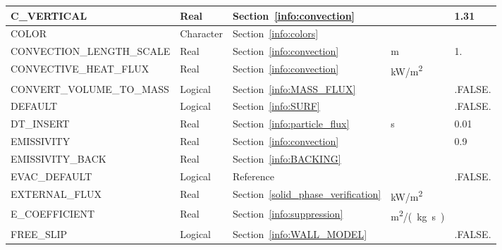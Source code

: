 \documentclass[11pt]{book}
\begin{document}
\begin{longtable}{@{\extracolsep{\fill}}|l|l|l|l|l|}
{\ct C\_VERTICAL}                       & Real            & Section~\ref{info:convection}             &                     & 1.31                    \\ \hline
{\ct COLOR    }                         & Character       & Section~\ref{info:colors}                 &                     &                         \\ \hline
{\ct CONVECTION\_LENGTH\_SCALE}         & Real            & Section~\ref{info:convection}             & m                   & 1.                      \\ \hline
{\ct CONVECTIVE\_HEAT\_FLUX}            & Real            & Section~\ref{info:convection}             & \si{kW/m^2}         &                         \\ \hline
{\ct CONVERT\_VOLUME\_TO\_MASS}         & Logical         & Section~\ref{info:MASS_FLUX}              &                     & {\ct .FALSE.}           \\ \hline
{\ct DEFAULT}                           & Logical         & Section~\ref{info:SURF}                   &                     & {\ct .FALSE.}           \\ \hline
{\ct DT\_INSERT}                        & Real            & Section~\ref{info:particle_flux}          & s                   & 0.01                    \\ \hline
{\ct EMISSIVITY}                        & Real            & Section~\ref{info:convection}             &                     & 0.9                     \\ \hline
{\ct EMISSIVITY\_BACK}                  & Real            & Section~\ref{info:BACKING}                &                     &                         \\ \hline
{\ct EVAC\_DEFAULT}                     & Logical         & Reference~\cite{FDS_Evac_Users_Guide}     &                     & {\ct .FALSE.}           \\ \hline
{\ct EXTERNAL\_FLUX}                    & Real            & Section~\ref{solid_phase_verification}    & \si{kW/m^2}         &                         \\ \hline
{\ct E\_COEFFICIENT}                    & Real            & Section~\ref{info:suppression}            & \si{m^2/(kg.s)}     &                         \\ \hline
{\ct FREE\_SLIP}                        & Logical         & Section~\ref{info:WALL_MODEL}             &                     & {\ct .FALSE.}           \\ \hline

\end{longtable}
\end{document}
